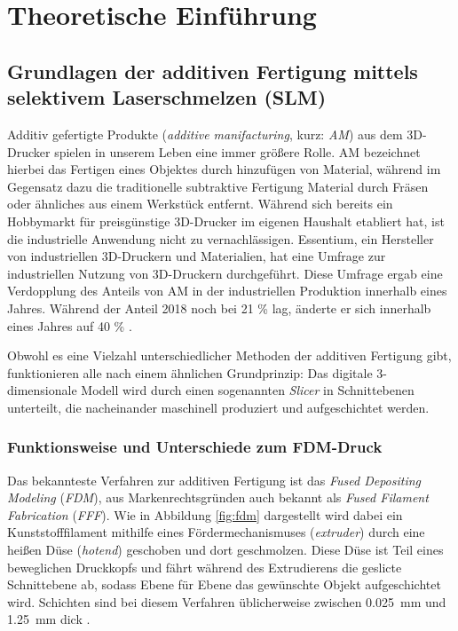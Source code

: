 \chapter{Theoretische Einführung}



\section{Grundlagen der additiven Fertigung mittels selektivem Laserschmelzen (SLM)}
	Additiv gefertigte Produkte (\emph{additive manifacturing}, kurz: \emph{AM}) aus dem
	3D-Drucker spielen in unserem Leben eine immer größere Rolle. AM bezeichnet hierbei das
	Fertigen eines Objektes durch hinzufügen von Material, während im Gegensatz dazu die
	traditionelle subtraktive Fertigung Material durch Fräsen oder ähnliches aus einem Werkstück
	entfernt. Während sich bereits ein Hobbymarkt für preisgünstige 3D-Drucker im eigenen Haushalt
	etabliert hat, ist die industrielle Anwendung nicht zu vernachlässigen. Essentium, ein
	Hersteller von industriellen 3D-Druckern und Materialien, hat eine Umfrage zur industriellen
	Nutzung von 3D-Druckern durchgeführt. Diese Umfrage ergab eine Verdopplung des Anteils von AM
	in der industriellen Produktion innerhalb eines Jahres. Während der Anteil 2018 noch bei 21 \%
	lag, änderte er sich innerhalb eines Jahres auf 40 \% \cite{stevenson2019survey}.

	Obwohl es eine Vielzahl unterschiedlicher Methoden der additiven Fertigung gibt, funktionieren
	alle nach einem ähnlichen Grundprinzip: Das digitale 3-dimension\-ale Modell wird durch einen
	sogenannten \emph{Slicer} in Schnittebenen unterteilt, die nacheinander maschinell produziert
	und aufgeschichtet werden.

	\subsection{Funktionsweise und Unterschiede zum FDM-Druck}
		Das bekannteste Verfahren zur additiven Fertigung ist das \emph{Fused Depositing Modeling}
		(\emph{FDM}), aus Markenrechtsgründen auch bekannt als \emph{Fused Filament Fabrication}
		(\emph{FFF}). Wie in Abbildung \ref{fig:fdm} dargestellt wird dabei ein Kunststofffilament
		mithilfe eines Fördermechanismuses (\emph{extruder}) durch eine heißen Düse
		(\emph{hotend}) geschoben und dort geschmolzen. Diese Düse ist Teil eines beweglichen
		Druckkopfs und fährt während des Extrudierens die geslicte Schnittebene ab, sodass Ebene
		für Ebene das gewünschte Objekt aufgeschichtet wird. Schichten sind bei diesem Verfahren
		üblicherweise zwischen \SI{0,025}{\milli\meter} und \SI{1,25}{\milli\meter} dick
		\cite{wikipedia2021fused}.

